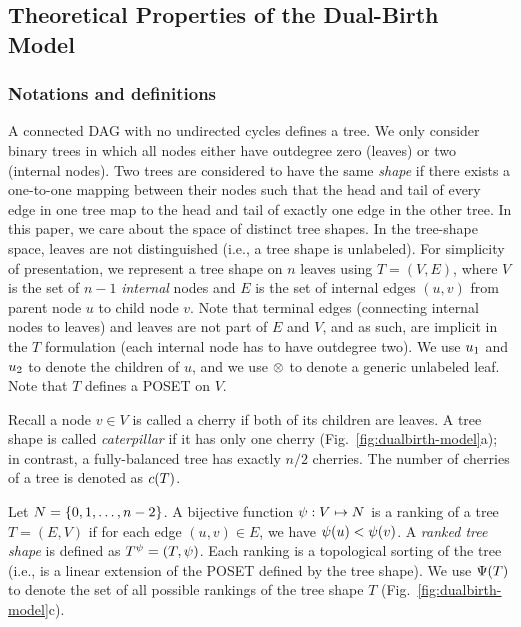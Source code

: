 \subsection{Theoretical Properties of the Dual-Birth Model}\label{sec:dualbirth-meth}
\subsubsection*{Notations and definitions}
A connected \gls{DAG} with no undirected cycles defines a tree. We only consider binary trees in which all nodes either have outdegree zero (leaves) or two (internal nodes). Two trees are considered to have the same \textit{shape} if there exists a one-to-one mapping between their nodes such that the head and tail of every edge in one tree map to the head and tail of exactly one edge in the other tree. In this paper, we care about the space of distinct tree shapes. In the tree-shape space, leaves are not distinguished (i.e., a tree shape is unlabeled). For simplicity of presentation, we represent a tree shape on $n$ leaves using $T=(V,E)$, where $V$ is the set of $n-1$ \textit{internal} nodes and $E$ is the set of internal edges $(u,v)$ from parent node $u$ to child node $v$. Note that terminal edges (connecting internal nodes to leaves) and leaves are not part of $E$ and $V$, and as such, are implicit in the $T$ formulation (each internal node has to have outdegree two). We use $u_{1}$ and $u_{2}$ to denote the children of $u$, and we use $\otimes$ to denote a generic unlabeled leaf. Note that $T$  defines a \gls{POSET} on $V$.

Recall a node $v\in V$ is called a cherry if both of its children are leaves. A tree shape is called \textit{caterpillar} if it has only one cherry (Fig.~\ref{fig:dualbirth-model}a); in contrast, a fully-balanced tree has exactly $n/2$ cherries. The number of cherries of a tree is denoted as $c(T)$.

Let $N=\{0,1,\ldots, n-2\}$. A bijective function $\psi:V\mapsto N$ is a ranking of a tree $T=(E,V)$  if for each edge $(u,v)\in E$, we have $\psi(u)<\psi(v)$. A \textit{ranked tree shape} is defined as $T^\psi= (T,\psi)$. Each ranking is a topological sorting of the tree (i.e., is a linear extension of the \gls{POSET} defined by the tree shape). We use $\Psi(T)$ to denote the set of all possible rankings of the tree shape $T$ (Fig.~\ref{fig:dualbirth-model}c).

